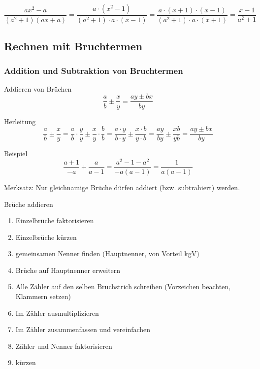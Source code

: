 \begin{beispiel}{}{}
$$\frac{ax^2 - a}{(a^2+1)(ax+a)}= \frac{a\cdot{}(x^2-1)}{(a^2+1)\cdot{}a\cdot{}(x-1)}=\frac{a\cdot{}(x+1)\cdot{}(x-1)}{(a^2+1)\cdot{}a\cdot{}(x+1)}=\frac{x-1}{a^2+1} $$
\end{beispiel}



\newpage
\subsection{Rechnen mit Bruchtermen}
  

\subsubsection{Addition und Subtraktion von Bruchtermen}

\begin{gesetz}{Addieren von Brüchen}{}
$$\frac{a}{b}\pm\frac{x}{y} = \frac{ay\pm{}bx}{by}$$
\end{gesetz}

Herleitung
$$\frac{a}{b}\pm\frac{x}{y} = \frac{a}{b}\cdot\frac{y}{y} \pm \frac{x}{y}\cdot\frac{b}{b} =
\frac{a\cdot y}{b\cdot y}\pm \frac{x\cdot b}{y \cdot b} = \frac{ay}{by}\pm\frac{xb}{yb} = \frac{ay\pm{}bx}{by}$$

Beispiel
$$\frac{a+1}{-a} + \frac{a}{a-1} = \frac{a^2 - 1 - a^2}{-a(a-1)} = \frac{1}{a(a-1)}$$

Merksatz: Nur gleichnamige Brüche dürfen addiert (bzw. subtrahiert)
werden.

\begin{rezept}{Brüche addieren}{}
\begin{enumerate}
	\item Einzelbrüche faktorisieren
	\item Einzelbrüche kürzen
	\item gemeinsamen Nenner finden (Hauptnenner, von Vorteil kgV)
	\item Brüche auf Hauptnenner erweitern
	\item Alle Zähler auf den selben Bruchstrich schreiben (Vorzeichen beachten, Klammern setzen)
	\item Im Zähler ausmultiplizieren
	\item Im Zähler zusammenfassen und vereinfachen
	\item Zähler und Nenner faktorisieren
	\item kürzen
\end{enumerate}
\end{rezept}


